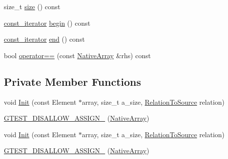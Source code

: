 \begin{DoxyCompactItemize}
size\-\_\-t \hyperlink{classtesting_1_1internal_1_1NativeArray_aac782da1f912bceb5d8ad00c8dc892ac}{size} () const 
\item 
\hyperlink{classtesting_1_1internal_1_1NativeArray_a673a2c2010a7e9bdcc7b6b75d54121f5}{const\-\_\-iterator} \hyperlink{classtesting_1_1internal_1_1NativeArray_aa4b02d4f1a8500fb07a551069060709f}{begin} () const 
\item 
\hyperlink{classtesting_1_1internal_1_1NativeArray_a673a2c2010a7e9bdcc7b6b75d54121f5}{const\-\_\-iterator} \hyperlink{classtesting_1_1internal_1_1NativeArray_a350132543d80a1c1e5be844e6d2878ea}{end} () const 
\item 
bool \hyperlink{classtesting_1_1internal_1_1NativeArray_ac0b5a9c6c5dc5e3f22622e7045810cec}{operator==} (const \hyperlink{classtesting_1_1internal_1_1NativeArray}{\-Native\-Array} \&rhs) const 
\end{DoxyCompactItemize}
\subsection*{\-Private \-Member \-Functions}
\begin{DoxyCompactItemize}
\item 
void \hyperlink{classtesting_1_1internal_1_1NativeArray_aab94fb8a57a804f3e3307a9100ef2636}{\-Init} (const \-Element $\ast$array, size\-\_\-t a\-\_\-size, \hyperlink{namespacetesting_1_1internal_ac00b9b1c1f19789e7b9ffda5a5d6cbf6}{\-Relation\-To\-Source} relation)
\item 
\hyperlink{classtesting_1_1internal_1_1NativeArray_ae09809b0ab011ef8f32f6bee8559038d}{\-G\-T\-E\-S\-T\-\_\-\-D\-I\-S\-A\-L\-L\-O\-W\-\_\-\-A\-S\-S\-I\-G\-N\-\_\-} (\hyperlink{classtesting_1_1internal_1_1NativeArray}{\-Native\-Array})
\item 
void \hyperlink{classtesting_1_1internal_1_1NativeArray_aab94fb8a57a804f3e3307a9100ef2636}{\-Init} (const \-Element $\ast$array, size\-\_\-t a\-\_\-size, \hyperlink{namespacetesting_1_1internal_ac00b9b1c1f19789e7b9ffda5a5d6cbf6}{\-Relation\-To\-Source} relation)
\item 
\hyperlink{classtesting_1_1internal_1_1NativeArray_ae09809b0ab011ef8f32f6bee8559038d}{\-G\-T\-E\-S\-T\-\_\-\-D\-I\-S\-A\-L\-L\-O\-W\-\_\-\-A\-S\-S\-I\-G\-N\-\_\-} (\hyperlink{classtesting_1_1internal_1_1NativeArray}{\-Native\-Array})
\end{DoxyCompactItemize}
